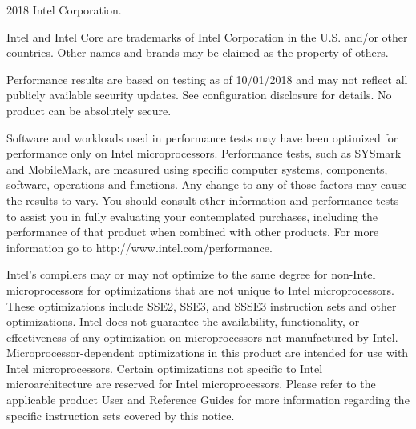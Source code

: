 \scriptsize
\begin{framed}

2018 Intel Corporation.

Intel and Intel Core are trademarks of Intel Corporation in
the U.S. and/or other countries. Other names and brands may be claimed as the property of others.

Performance results are based on testing as of 10/01/2018 and may not reflect
all publicly available security updates.
See configuration disclosure for details.
No product can be absolutely secure.

Software and workloads used in performance tests may have been optimized for
performance only on Intel microprocessors. Performance tests, such as SYSmark
and MobileMark, are measured using specific computer systems, components,
software, operations and functions.
Any change to any of those factors may cause
the results to vary. You should consult other information and performance tests
to assist you in fully evaluating your contemplated purchases, including the
performance of that product when combined with other products. For more
information go to http://www.intel.com/performance.

Intel's compilers may or may not optimize to the same degree for non-Intel
microprocessors for optimizations that are not unique to Intel
microprocessors.
These optimizations include SSE2, SSE3, and SSSE3 instruction
sets and other optimizations. Intel does not guarantee the availability,
functionality, or effectiveness of any optimization on microprocessors not
manufactured by Intel. Microprocessor-dependent optimizations in this product
are intended for use with Intel microprocessors. Certain optimizations not
specific to Intel microarchitecture are reserved for Intel microprocessors.
Please refer to the applicable product User and Reference Guides for more
information regarding the specific instruction sets covered by this notice.
\end{framed}
